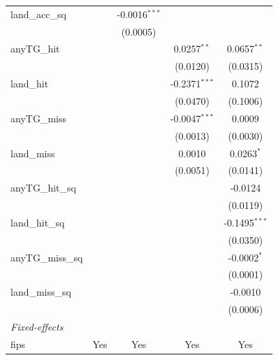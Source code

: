 \documentclass{article}
\begin{document}
\begin{appendices}
\begin{table}[htbp]
\begin{tabular}{lcccc}
      land\_acc\_sq     &                 & -0.0016$^{***}$ &                 &   \\   
                        &                 & (0.0005)        &                 &   \\   
      anyTG\_hit        &                 &                 & 0.0257$^{**}$   & 0.0657$^{**}$\\   
                        &                 &                 & (0.0120)        & (0.0315)\\   
      land\_hit         &                 &                 & -0.2371$^{***}$ & 0.1072\\   
                        &                 &                 & (0.0470)        & (0.1006)\\   
      anyTG\_miss       &                 &                 & -0.0047$^{***}$ & 0.0009\\   
                        &                 &                 & (0.0013)        & (0.0030)\\   
      land\_miss        &                 &                 & 0.0010          & 0.0263$^{*}$\\   
                        &                 &                 & (0.0051)        & (0.0141)\\   
      anyTG\_hit\_sq    &                 &                 &                 & -0.0124\\   
                        &                 &                 &                 & (0.0119)\\   
      land\_hit\_sq     &                 &                 &                 & -0.1495$^{***}$\\   
                        &                 &                 &                 & (0.0350)\\   
      anyTG\_miss\_sq   &                 &                 &                 & -0.0002$^{*}$\\   
                        &                 &                 &                 & (0.0001)\\   
      land\_miss\_sq    &                 &                 &                 & -0.0010\\   
                        &                 &                 &                 & (0.0006)\\   
      \midrule
      \emph{Fixed-effects}\\
      fips              & Yes             & Yes             & Yes             & Yes\\  

\end{tabular}
\end{table}
\end{appendices}
\end{document}
